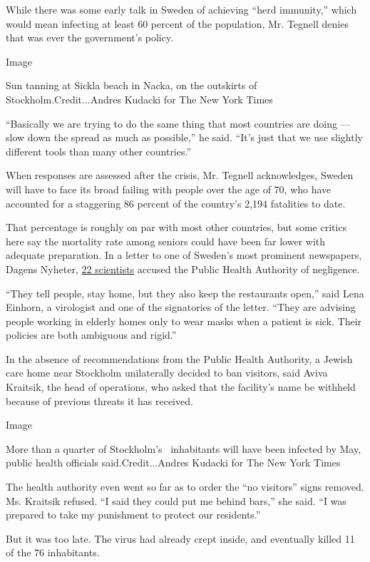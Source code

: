While there was some early talk in Sweden of achieving ``herd
immunity,'' which would mean infecting at least 60 percent of the
population, Mr. Tegnell denies that was ever the government's policy.

Image

Sun tanning at Sickla beach in Nacka, on the outskirts of
Stockholm.Credit...Andres Kudacki for The New York Times

``Basically we are trying to do the same thing that most countries are
doing --- slow down the spread as much as possible,'' he said. ``It's
just that we use slightly different tools than many other countries.''

When responses are assessed after the crisis, Mr. Tegnell acknowledges,
Sweden will have to face its broad failing with people over the age of
70, who have accounted for a staggering 86 percent of the country's
2,194 fatalities to date.

That percentage is roughly on par with most other countries, but some
critics here say the mortality rate among seniors could have been far
lower with adequate preparation. In a letter to one of Sweden's most
prominent newspapers, Dagens Nyheter,
\href{https://www.dn.se/debatt/folkhalsomyndigheten-har-misslyckats-nu-maste-politikerna-gripa-in/}{22
scientists} accused the Public Health Authority of negligence.

``They tell people, stay home, but they also keep the restaurants
open,'' said Lena Einhorn, a virologist and one of the signatories of
the letter. ``They are advising people working in elderly homes only to
wear masks when a patient is sick. Their policies are both ambiguous and
rigid.''

In the absence of recommendations from the Public Health Authority, a
Jewish care home near Stockholm unilaterally decided to ban visitors,
said Aviva Kraitsik, the head of operations, who asked that the
facility's name be withheld because of previous threats it has received.

Image

More than a quarter of Stockholm's~ inhabitants will have been infected
by May, public health officials said.Credit...Andres Kudacki for The New
York Times

The health authority even went so far as to order the ``no visitors''
signs removed. Ms. Kraitsik refused. ``I said they could put me behind
bars,'' she said. ``I was prepared to take my punishment to protect our
residents.''

But it was too late. The virus had already crept inside, and eventually
killed 11 of the 76 inhabitants.


